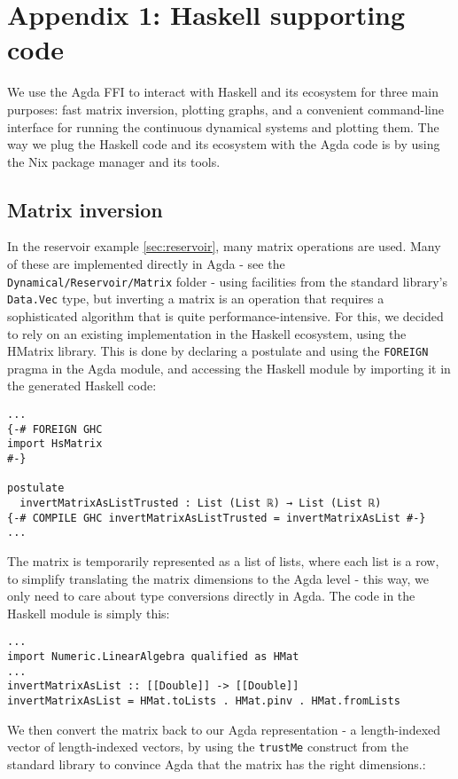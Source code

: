 \chapter{Appendix 1: Haskell supporting code}
\label{app:haskell}

We use the Agda FFI to interact with Haskell and its ecosystem for three main purposes: fast matrix inversion, plotting graphs, and a convenient command-line interface for running the continuous dynamical systems and plotting them. The way we plug the Haskell code and its ecosystem with the Agda code is by using the Nix package manager\cite{nix} and its tools.

\section{Matrix inversion}
In the reservoir example \ref{sec:reservoir}, many matrix operations are used. Many of these are implemented directly in Agda - see the \texttt{Dynamical/Reservoir/Matrix} folder - using facilities from the standard library's \texttt{Data.Vec} type, but inverting a matrix is an operation that requires a sophisticated algorithm that is quite performance-intensive. For this, we decided to rely on an existing implementation in the Haskell ecosystem, using the HMatrix \cite{hmatrix} library. This is done by declaring a postulate and using the \texttt{FOREIGN} pragma in the Agda module, and accessing the Haskell module by importing it in the generated Haskell code:
\begin{verbatim}
...
{-# FOREIGN GHC
import HsMatrix
#-}

postulate
  invertMatrixAsListTrusted : List (List ℝ) → List (List ℝ)
{-# COMPILE GHC invertMatrixAsListTrusted = invertMatrixAsList #-}
...
\end{verbatim}
The matrix is temporarily represented as a list of lists, where each list is a row, to simplify translating the matrix dimensions to the Agda level - this way, we only need to care about type conversions directly in Agda. The code in the Haskell module is simply this:
\begin{verbatim}
...
import Numeric.LinearAlgebra qualified as HMat
...
invertMatrixAsList :: [[Double]] -> [[Double]]
invertMatrixAsList = HMat.toLists . HMat.pinv . HMat.fromLists
\end{verbatim}

We then convert the matrix back to our Agda representation - a length-indexed vector of length-indexed vectors, by using the \texttt{trustMe} construct from the standard library to convince Agda that the matrix has the right dimensions.:

